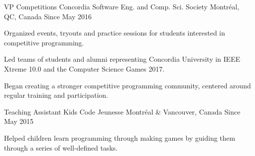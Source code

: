 

\begin{cventries}


  \cventry
    {VP Competitions} %
    {Concordia Software Eng. and Comp. Sci. Society} %
    {Montréal, QC, Canada} %
    {Since May 2016} %
    {
      \begin{cvitems} %
        \item {Organized events, tryouts and practice sessions for students interested in competitive programming.}
        \item {Led teams of students and alumni representing Concordia University in IEEE Xtreme 10.0 and the Computer Science Games 2017.}
        \item {Began creating a stronger competitive programming community, centered around regular training and participation.}
      \end{cvitems}
    }
    \vspace{2.0mm}
  \cventry
    {Teaching Assistant} %
    {Kids Code Jeunesse} %
    {Montréal \& Vancouver, Canada} %
    {Since May 2015} %
    {
      \begin{cvitems} %
        \item {Helped children learn programming through making games by guiding them through a series of well-defined tasks.}
        \\
      \end{cvitems}
    }
    \vspace{2.0mm}


\end{cventries}

